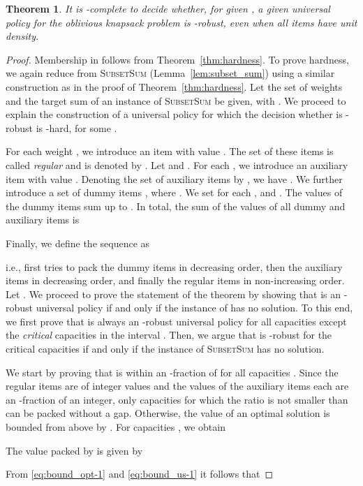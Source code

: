 \documentclass[11pt]{article}
\newtheorem{theorem}{Theorem}
\begin{document}
\begin{theorem}
\label{thm:hardness_unit} It is -complete to decide
whether, for given , a given universal policy for the oblivious
knapsack problem is -robust, even when all items have unit
density.\end{theorem}
\begin{proof}
Membership in  follows from Theorem~\ref{thm:hardness}.
To prove hardness, we again reduce from \textsc{SubsetSum} (Lemma~\ref{lem:subset_sum})
using a similar construction as in the proof of Theorem~\ref{thm:hardness}.
Let the set  of weights and the target sum
 of an instance of \textsc{SubsetSum} be given, with .
We proceed to explain the construction of a universal policy 
for which the decision whether  is -robust is -hard,
for some .

For each weight , we introduce an item  with value
. The set of these items is called \emph{regular} and
is denoted by . Let  and .
For each , we introduce an auxiliary item 
with value . Denoting the set of auxiliary
items by , we have .
We further introduce a set of dummy items ,
where . We set 
for each , and . The
values of the dummy items sum up to .
In total, the sum of the values of all dummy and auxiliary items is

Finally, we define the sequence  as 

i.e.,  first tries to pack the dummy items in decreasing order,
then the auxiliary items in decreasing order, and finally the regular
items in non-increasing order. Let .
We proceed to prove the statement of the theorem by showing that 
is an -robust universal policy if and only if the instance
 of  has no solution. To this end, we
first prove that  is always an -robust universal policy
for all capacities except the \emph{critical} capacities in the interval
. Then, we argue that  is
-robust for the critical capacities if and only if the instance
 of \textsc{SubsetSum} has no solution.

We start by proving that  is within an -fraction
of  for all capacities . Since
the regular items are of integer values and the values of the auxiliary
items each are an -fraction of an integer, only capacities
 for which the ratio  is not smaller than 
can be packed without a gap. Otherwise, the value of an optimal solution
is bounded from above by . For capacities ,
we obtain

The value packed by  is given by

From \eqref{eq:bound_opt-1} and \eqref{eq:bound_us-1} it follows
that 


\end{proof}
\end{document}
